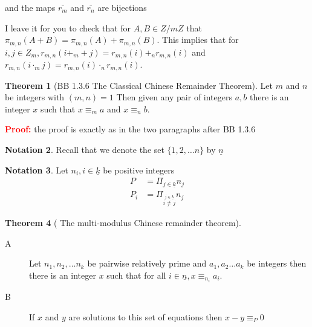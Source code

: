 \documentclass[12pt]{amsart}
\newcommand{\bed}{\begin{description}}
\newcommand{\ed}{\end{description}}
\theoremstyle{definition}
\newtheorem{theorem}{Theorem}
\newtheorem{notation}[theorem]{Notation}
\newcommand{\bnot}{\begin{notation}}
\newcommand{\enot}{\end{notation}}
\newcommand{\bet}{\begin{theorem}}
\newcommand{\et}{\end{theorem}}
\newcommand{\pru}{{ \bfseries \textcolor{red}{Proof:} }}
\begin{document}
 and
the maps $\overline{r_m}$ and $\overline{r_n}$ are bijections


I leave it for you to check that for $A,B\in Z/mZ$ that  $\pi_{m,n}(A+B)=\pi_{m,n}(A)+\pi_{m,n}(B)$. This implies that for $i,j\in Z_m, r_{m,n}(i+_m +j)=r_{m,n}(i)+_nr_{m,n}(i)$ and  $r_{m,n}(i \cdot_m j)=r_{m,n}(i)\cdot_n r_{m,n}(i)$.
\bet[BB 1.3.6 The Classical Chinese Remainder Theorem] Let $m$ and $n$ be integers with $(m,n)=1$ Then given any pair of integers $a,b$ there is an integer $x$ such that $x\equiv_m a$ and $x\equiv_n b$.

\pru the proof is exactly as in the two paragraphs after BB 1.3.6 
\et
\bnot Recall that we denote the set $\{1,2,\dots n\}$ by $\underline{n}$
\enot
\bnot Let $n_i,i\in\underline{k}$ be positive integers
\begin{align*}
P&=\Pi_{j\in\underline{k}} n_j\\ 
P_i&=\Pi_{\overset{j\in \underline{k}}{i\neq j}}n_j
\end{align*}
\enot
\bet[ The multi-modulus Chinese remainder theorem]\label{gencrt} \hfill

\bed
\item[A]Let $n_1,n_2,\dots n_k$ be pairwise relatively prime and $a_1,a_2\dots a_k$ be integers then there is an integer $x$ such that for all $i\in\underline{n}, x\equiv_{n_i}a_i$.
\item[B] If $x$ and $y$ are solutions to this set of equations then $x-y\equiv_P 0$
\ed
\et
\end{document}
